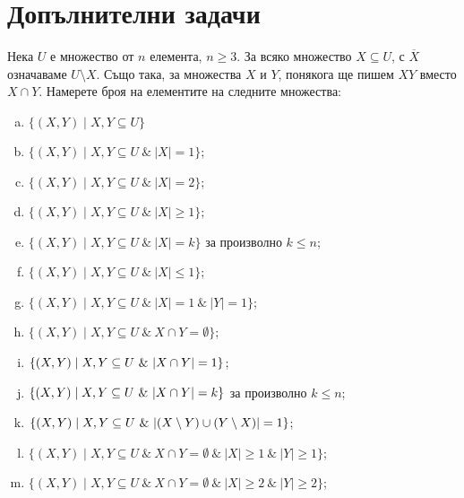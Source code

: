 \section{Допълнителни задачи}

\begin{problem} %
  Нека $U$ е множество от $n$ елемента, $n\geq 3$. За всяко множество $X\subseteq U$, с $\overline{X}$ означаваме $U\setminus X$.
  Също така, за множества $X$ и $Y$, понякога ще пишем $XY$ вместо $X \cap Y$.
  Намерете броя на елементите на следните множества:
  \begin{enumerate}[a)]
  \item
    $\{(X,Y) \mid X,Y\subseteq U\}$
  \item
    $\{(X,Y) \mid X,Y\subseteq U\ \&\ \vert{X}\vert = 1\}$;
  \item
    $\{(X,Y) \mid X,Y\subseteq U\ \&\ \vert{X}\vert = 2\}$;
  \item
    $\{(X,Y) \mid X,Y\subseteq U\ \&\ \vert{X}\vert \geq 1\}$;
  \item
    $\{(X,Y) \mid X,Y\subseteq U\ \&\ \vert{X}\vert = k\}$ за произволно $k \leq n$;
  \item
    $\{(X,Y) \mid X,Y\subseteq U\ \&\ \vert{X}\vert \leq 1\}$;
  \item
    $\{(X,Y) \mid X,Y\subseteq U\ \&\ \vert{X}\vert = 1\ \&\ \vert{Y}\vert = 1\}$;
  \item
    $\{(X,Y) \mid X,Y\subseteq U\ \&\ X \cap Y = \emptyset\}$;
  \item
    $\{(X,Y) \mid X,Y\subseteq U\ \&\ \abs{X \cap Y} = 1\}$;
  \item
    $\{(X,Y) \mid X,Y\subseteq U\ \&\ \abs{X \cap Y} = k\}$ за произволно $k \leq n$;
  \item
    $\{(X,Y) \mid X,Y\subseteq U\ \&\ \abs{(X\setminus Y) \cup (Y\setminus X)} = 1\}$;
  \item
    $\{(X,Y) \mid X,Y\subseteq U\ \&\ X\cap Y = \emptyset\ \&\ |X|\geq 1\ \&\ |Y|\geq 1\}$;
  \item
    $\{(X,Y) \mid X,Y\subseteq U\ \&\ X\cap Y = \emptyset\ \&\ |X|\geq 2\ \&\ |Y|\geq 2\}$;

\end{enumerate}
\end{problem}
